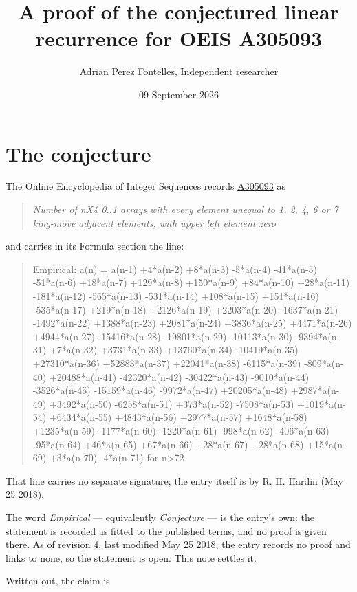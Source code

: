 \documentclass[11pt]{article}
\title{A proof of the conjectured linear recurrence for OEIS A305093}
\author{Adrian Perez Fontelles, Independent researcher}
\date{09 September 2026}
\theoremstyle{definition}
\begin{document}
\maketitle
\section{The conjecture}

The Online Encyclopedia of Integer Sequences records \href{https://oeis.org/A305093}{A305093} as

\begin{quote}\itshape Number of nX4 0..1 arrays with every element unequal to 1, 2, 4, 6 or 7 king-move adjacent elements, with upper left element zero\end{quote}

and carries in its Formula section the line:

\begin{quote}\ttfamily Empirical: a(n) = a(n-1) +4*a(n-2) +8*a(n-3) -5*a(n-4) -41*a(n-5) -51*a(n-6) +18*a(n-7) +129*a(n-8) +150*a(n-9) +84*a(n-10) +28*a(n-11) -181*a(n-12) -565*a(n-13) -531*a(n-14) +108*a(n-15) +151*a(n-16) -535*a(n-17) +219*a(n-18) +2126*a(n-19) +2203*a(n-20) -1637*a(n-21) -1492*a(n-22) +1388*a(n-23) +2081*a(n-24) +3836*a(n-25) +4471*a(n-26) +4944*a(n-27) -15416*a(n-28) -19801*a(n-29) -10113*a(n-30) -9394*a(n-31) +7*a(n-32) +3731*a(n-33) +13760*a(n-34) -10419*a(n-35) +27310*a(n-36) +52883*a(n-37) +22041*a(n-38) -6115*a(n-39) -809*a(n-40) +20488*a(n-41) -42320*a(n-42) -30422*a(n-43) -9010*a(n-44) -3526*a(n-45) -15159*a(n-46) -9972*a(n-47) +20205*a(n-48) +2987*a(n-49) +3492*a(n-50) -6258*a(n-51) +373*a(n-52) -7508*a(n-53) +1019*a(n-54) +6434*a(n-55) +4843*a(n-56) +2977*a(n-57) +1648*a(n-58) +1235*a(n-59) -1177*a(n-60) -1220*a(n-61) -998*a(n-62) -406*a(n-63) -95*a(n-64) +46*a(n-65) +67*a(n-66) +28*a(n-67) +28*a(n-68) +15*a(n-69) +3*a(n-70) -4*a(n-71) for n>72\end{quote}

That line carries no separate signature; the entry itself is by R. H. Hardin (May 25 2018).

The word {\itshape Empirical} --- equivalently {\itshape Conjecture} --- is the entry's own: the statement is recorded as fitted to the published terms, and no proof is given there. As of revision 4, last modified May 25 2018, the entry records no proof and links to none, so the statement is open. This note settles it.

Written out, the claim is
\end{document}
